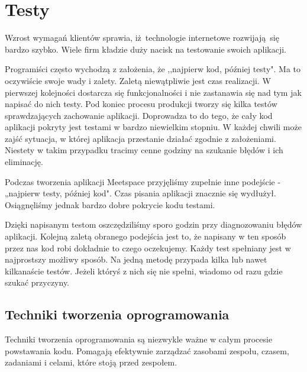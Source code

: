 \section{Testy}
  \label{testy}
  Wzrost wymagań klientów sprawia, iż technologie internetowe rozwijają się bardzo szybko. Wiele firm kładzie duży nacisk na testowanie swoich aplikacji.

  Programiści często wychodzą z założenia, że ,,najpierw kod, później testy". Ma to oczywiście swoje wady i zalety. Zaletą niewątpliwie jest czas realizacji. W pierwszej kolejności dostarcza się funkcjonalności i nie zastanawia się nad tym jak napisać do nich testy. Pod koniec procesu produkcji tworzy się kilka testów sprawdzających zachowanie aplikacji. Doprowadza to do tego, że cały kod aplikacji pokryty jest testami w bardzo niewielkim stopniu. W każdej chwili może zajść sytuacja, w której aplikacja przestanie działać zgodnie z założeniami. Niestety w takim przypadku tracimy cenne godziny na szukanie błędów i ich eliminację.

  Podczas tworzenia aplikacji Meetspace przyjęliśmy zupełnie inne podejście - „najpierw testy, później kod". Czas pisania aplikacji znacznie się wydłużył. Osiągnęliśmy jednak bardzo dobre pokrycie kodu testami.

  Dzięki napisanym testom oszczędziliśmy sporo godzin przy diagnozowaniu błędów aplikacji. Kolejną zaletą obranego podejścia jest to, że napisany w ten sposób przez nas kod robi dokładnie to czego oczekujemy. Każdy test spełniany jest w najprostszy możliwy sposób. Na jedną metodę przypada kilka lub nawet kilkanaście testów. Jeżeli któryś z nich się nie spełni, wiadomo od razu gdzie szukać przyczyny.

  \subsection{Techniki tworzenia oprogramowania}
    Techniki tworzenia oprogramowania są niezwykle ważne w całym procesie powstawania kodu. Pomagają efektywnie zarządzać zasobami zespołu, czasem, zadaniami i celami, które stoją przed zespołem.

